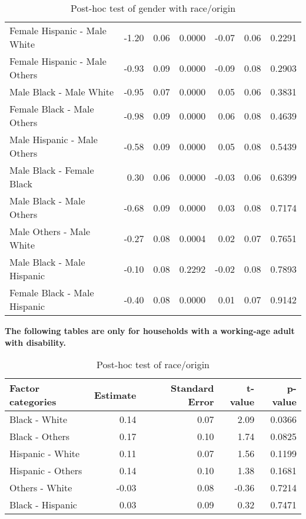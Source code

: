 \begin{table}[H]
\begin{tabular}{lrrrrrr}
    Female Hispanic -  Male White & -1.20 & 0.06 & 0.0000 & -0.07 & 0.06 & 0.2291 \\ 
    Female Hispanic -  Male Others & -0.93 & 0.09 & 0.0000 & -0.09 & 0.08 & 0.2903 \\ 
    Male Black -  Male White & -0.95 & 0.07 & 0.0000 & 0.05 & 0.06 & 0.3831 \\ 
    Female Black -  Male Others & -0.98 & 0.09 & 0.0000 & 0.06 & 0.08 & 0.4639 \\ 
    Male Hispanic -  Male Others & -0.58 & 0.09 & 0.0000 & 0.05 & 0.08 & 0.5439 \\ 
    Male Black -  Female Black & 0.30 & 0.06 & 0.0000 & -0.03 & 0.06 & 0.6399 \\ 
    Male Black -  Male Others & -0.68 & 0.09 & 0.0000 & 0.03 & 0.08 & 0.7174 \\ 
    Male Others -  Male White & -0.27 & 0.08 & 0.0004 & 0.02 & 0.07 & 0.7651 \\ 
    Male Black -  Male Hispanic & -0.10 & 0.08 & 0.2292 & -0.02 & 0.08 & 0.7893 \\ 
    Female Black -  Male Hispanic & -0.40 & 0.08 & 0.0000 & 0.01 & 0.07 & 0.9142 \\ 
   \hline
\end{tabular}
\caption{Post-hoc test of gender with race/origin} 
\label{tab:GenderRaceOrigin}
\end{table}

{\bf{The following tables are only for households with a working-age adult with disability.}} \\

\begin{table}[H]
\footnotesize
\centering
\begin{tabular}{lrrrr}
  \hline
  Factor categories & Estimate & Standard Error & t-value & p-value \\ 
  \hline
   Black - White & 0.14 & 0.07 & 2.09 & 0.0366 \\ 
   Black - Others & 0.17 & 0.10 & 1.74 & 0.0825 \\ 
   Hispanic - White & 0.11 & 0.07 & 1.56 & 0.1199 \\ 
   Hispanic - Others & 0.14 & 0.10 & 1.38 & 0.1681 \\ 
   Others - White & -0.03 & 0.08 & -0.36 & 0.7214 \\ 
   Black - Hispanic & 0.03 & 0.09 & 0.32 & 0.7471 \\ 
  \hline
\end{tabular}
\caption{Post-hoc test of race/origin} 
\label{tab:DisabRaceOrigin}
\end{table}

